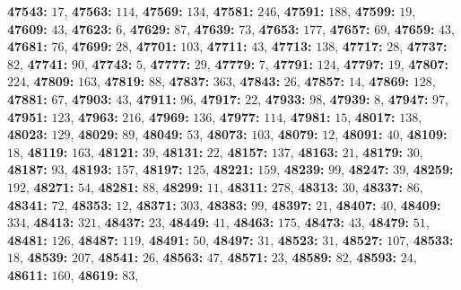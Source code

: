 \textsf{\bfseries 47543:} $17$, \textsf{\bfseries 47563:} $114$, \textsf{\bfseries 47569:} $134$, \textsf{\bfseries 47581:} $246$, \textsf{\bfseries 47591:} $188$, \textsf{\bfseries 47599:} $19$, \textsf{\bfseries 47609:} $43$, \textsf{\bfseries 47623:} $6$, \textsf{\bfseries 47629:} $87$, \textsf{\bfseries 47639:} $73$, \textsf{\bfseries 47653:} $177$, \textsf{\bfseries 47657:} $69$, \textsf{\bfseries 47659:} $43$, \textsf{\bfseries 47681:} $76$, \textsf{\bfseries 47699:} $28$, \textsf{\bfseries 47701:} $103$, \textsf{\bfseries 47711:} $43$, \textsf{\bfseries 47713:} $138$, \textsf{\bfseries 47717:} $28$, \textsf{\bfseries 47737:} $82$, \textsf{\bfseries 47741:} $90$, \textsf{\bfseries 47743:} $5$, \textsf{\bfseries 47777:} $29$, \textsf{\bfseries 47779:} $7$, \textsf{\bfseries 47791:} $124$, \textsf{\bfseries 47797:} $19$, \textsf{\bfseries 47807:} $224$, \textsf{\bfseries 47809:} $163$, \textsf{\bfseries 47819:} $88$, \textsf{\bfseries 47837:} $363$, \textsf{\bfseries 47843:} $26$, \textsf{\bfseries 47857:} $14$, \textsf{\bfseries 47869:} $128$, \textsf{\bfseries 47881:} $67$, \textsf{\bfseries 47903:} $43$, \textsf{\bfseries 47911:} $96$, \textsf{\bfseries 47917:} $22$, \textsf{\bfseries 47933:} $98$, \textsf{\bfseries 47939:} $8$, \textsf{\bfseries 47947:} $97$, \textsf{\bfseries 47951:} $123$, \textsf{\bfseries 47963:} $216$, \textsf{\bfseries 47969:} $136$, \textsf{\bfseries 47977:} $114$, \textsf{\bfseries 47981:} $15$, \textsf{\bfseries 48017:} $138$, \textsf{\bfseries 48023:} $129$, \textsf{\bfseries 48029:} $89$, \textsf{\bfseries 48049:} $53$, \textsf{\bfseries 48073:} $103$, \textsf{\bfseries 48079:} $12$, \textsf{\bfseries 48091:} $40$, \textsf{\bfseries 48109:} $18$, \textsf{\bfseries 48119:} $163$, \textsf{\bfseries 48121:} $39$, \textsf{\bfseries 48131:} $22$, \textsf{\bfseries 48157:} $137$, \textsf{\bfseries 48163:} $21$, \textsf{\bfseries 48179:} $30$, \textsf{\bfseries 48187:} $93$, \textsf{\bfseries 48193:} $157$, \textsf{\bfseries 48197:} $125$, \textsf{\bfseries 48221:} $159$, \textsf{\bfseries 48239:} $99$, \textsf{\bfseries 48247:} $39$, \textsf{\bfseries 48259:} $192$, \textsf{\bfseries 48271:} $54$, \textsf{\bfseries 48281:} $88$, \textsf{\bfseries 48299:} $11$, \textsf{\bfseries 48311:} $278$, \textsf{\bfseries 48313:} $30$, \textsf{\bfseries 48337:} $86$, \textsf{\bfseries 48341:} $72$, \textsf{\bfseries 48353:} $12$, \textsf{\bfseries 48371:} $303$, \textsf{\bfseries 48383:} $99$, \textsf{\bfseries 48397:} $21$, \textsf{\bfseries 48407:} $40$, \textsf{\bfseries 48409:} $334$, \textsf{\bfseries 48413:} $321$, \textsf{\bfseries 48437:} $23$, \textsf{\bfseries 48449:} $41$, \textsf{\bfseries 48463:} $175$, \textsf{\bfseries 48473:} $43$, \textsf{\bfseries 48479:} $51$, \textsf{\bfseries 48481:} $126$, \textsf{\bfseries 48487:} $119$, \textsf{\bfseries 48491:} $50$, \textsf{\bfseries 48497:} $31$, \textsf{\bfseries 48523:} $31$, \textsf{\bfseries 48527:} $107$, \textsf{\bfseries 48533:} $18$, \textsf{\bfseries 48539:} $207$, \textsf{\bfseries 48541:} $26$, \textsf{\bfseries 48563:} $47$, \textsf{\bfseries 48571:} $23$, \textsf{\bfseries 48589:} $82$, \textsf{\bfseries 48593:} $24$, \textsf{\bfseries 48611:} $160$, \textsf{\bfseries 48619:} $83$, 
